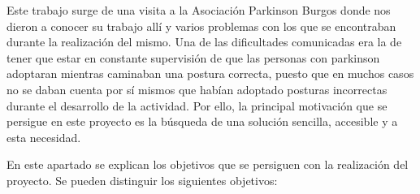 Este trabajo surge de una visita a la Asociación Parkinson Burgos\cite{ParkinsonBurgos} donde nos dieron a conocer su trabajo allí y varios problemas con los que se encontraban durante la realización del mismo. Una de las dificultades comunicadas era la de tener que estar en constante supervisión de que las personas con parkinson adoptaran mientras caminaban una postura correcta, puesto que en muchos casos no se daban cuenta por sí mismos que habían adoptado posturas incorrectas durante el desarrollo de la actividad. Por ello, la principal motivación que se persigue en este proyecto es la búsqueda de una solución sencilla, accesible y  a esta necesidad.

En este apartado se explican los objetivos que se persiguen con la realización del proyecto. Se pueden distinguir los siguientes objetivos:

